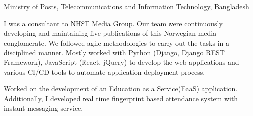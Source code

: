 \documentclass[10pt,a4paper]{altacv}
\begin{document}
\tagline{}

\begin{fullwidth}
\makecvheader
\end{fullwidth}


Ministry of Posts, Telecommunications and Information Technology, Bangladesh
\divider


I was a consultant to NHST Media Group. Our team were continuously developing and maintaining five publications of this Norwegian media conglomerate. We followed agile methodologies to carry out the tasks in a disciplined manner. Mostly worked with Python (Django, Django REST Framework), JavaScript (React, jQuery) to develop the web applications and various CI/CD tools to automate application deployment process.

\divider

Worked on the development of an Education as a Service(EaaS) application. Additionally, I developed real time fingerprint based attendance system with instant messaging service.
\end{document}
